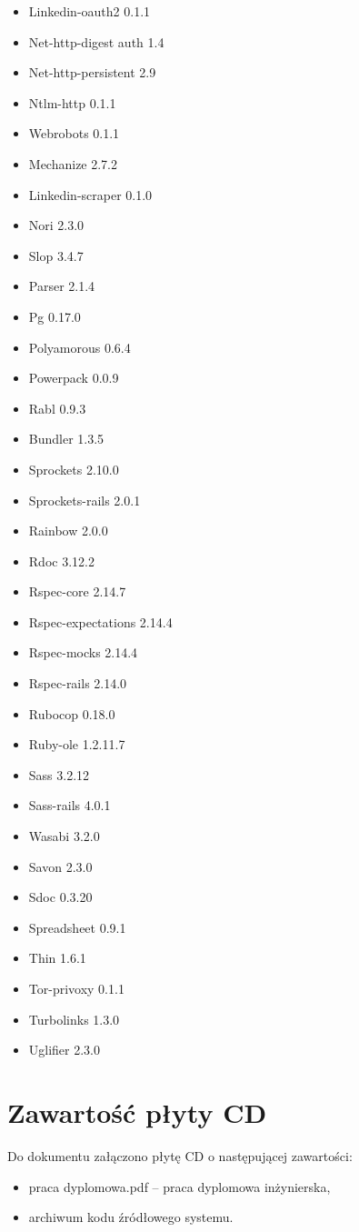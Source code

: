 \begin{itemize}
\item Linkedin-oauth2 0.1.1
\item Net-http-digest auth 1.4
\item Net-http-persistent 2.9
\item Ntlm-http 0.1.1
\item Webrobots 0.1.1
\item Mechanize 2.7.2
\item Linkedin-scraper 0.1.0
\item Nori 2.3.0
\item Slop 3.4.7
\item Parser 2.1.4
\item Pg 0.17.0
\item Polyamorous 0.6.4
\item Powerpack 0.0.9
\item Rabl 0.9.3
\item Bundler 1.3.5
\item Sprockets 2.10.0
\item Sprockets-rails 2.0.1
\item Rainbow 2.0.0
\item Rdoc 3.12.2
\item Rspec-core 2.14.7
\item Rspec-expectations 2.14.4
\item Rspec-mocks 2.14.4
\item Rspec-rails 2.14.0
\item Rubocop 0.18.0
\item Ruby-ole 1.2.11.7
\item Sass 3.2.12
\item Sass-rails 4.0.1
\item Wasabi 3.2.0
\item Savon 2.3.0
\item Sdoc 0.3.20
\item Spreadsheet 0.9.1
\item Thin 1.6.1
\item Tor-privoxy 0.1.1
\item Turbolinks 1.3.0
\item Uglifier 2.3.0
\end{itemize}

\section{Zawartość płyty CD}

Do dokumentu załączono płytę CD o następującej zawartości:

\begin{itemize}
\item praca dyplomowa.pdf – praca dyplomowa inżynierska,
\item archiwum kodu źródłowego systemu.
\end{itemize}